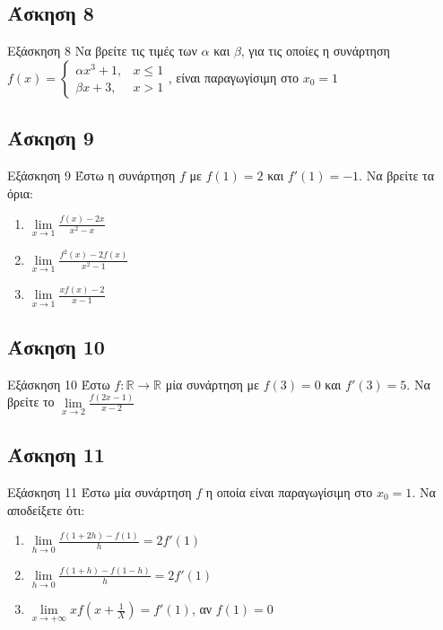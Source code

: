 \documentclass[greek]{beamer}
\begin{document}
\subsection{Άσκηση 8}
\begin{frame}{Εξάσκηση 8}
  Να βρείτε τις τιμές των $α$ και $β$, για τις οποίες η συνάρτηση
  $f(x)=\begin{cases}
      αx^3+1, & x\le 1 \\
      βx+3,   & x >1
    \end{cases}$, είναι παραγωγίσιμη στο $x_0=1$
\end{frame}

\subsection{Άσκηση 9}
\begin{frame}[label=Άσκηση9]{Εξάσκηση 9}
  Έστω η συνάρτηση $f$ με $f(1)=2$ και $f'(1)=-1$. Να βρείτε τα όρια:
  \begin{enumerate}
    \item<1-> $\lim\limits_{x \to 1}{ \frac{f(x)-2x}{x^2-x}}$
    \item<2-> $\lim\limits_{x \to 1}{ \frac{f^2(x)-2f(x)}{x^2-1}}$
    \item<3-> $\lim\limits_{x \to 1}{ \frac{xf(x)-2}{x-1}}$
  \end{enumerate}

\end{frame}

\subsection{Άσκηση 10}
\begin{frame}[label=Άσκηση10]{Εξάσκηση 10}
  Έστω $f:\mathbb{R}\to\mathbb{R}$ μία συνάρτηση με $f(3)=0$ και $f'(3)=5$. Να βρείτε το $\lim\limits_{x \to 2}{ \frac{f(2x-1)}{x-2} }$

\end{frame}

\subsection{Άσκηση 11}
\begin{frame}[label=Άσκηση11]{Εξάσκηση 11}
  Έστω μία συνάρτηση $f$ η οποία είναι παραγωγίσιμη στο $x_0=1$. Να αποδείξετε ότι:
  \begin{enumerate}
    \item<1-> $\lim\limits_{h \to 0}{ \frac{f(1+2h)-f(1)}{h} }=2f'(1)$
    \item<2-> $\lim\limits_{h \to 0}{ \frac{f(1+h)-f(1-h)}{h} }=2f'(1)$
    \item<3-> $\lim\limits_{x \to +\infty}{ xf\left( x+\frac{1}{X} \right) }=f'(1)$, αν $f(1)=0$
  \end{enumerate}

\end{frame}
\end{document}
